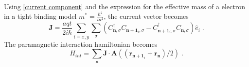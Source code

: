 \documentclass{article}
\begin{document}
Using \cref{current component} and the expression for the effective mass of a electron in a tight binding model $m^* = \frac{\hbar^2}{t a^2}$, the current vector becomes
\begin{equation}
    \textbf{J} = \frac{a q t}{2i\hbar} \sum_{i=x,y}\sum_{\sigma} \left( C_{\textbf{n},\sigma}^{\dagger} C_{\textbf{n} + \textbf{1}_i,\sigma} - C_{\textbf{n} + \textbf{1}_i,\sigma}^{\dagger} C_{\textbf{n},\sigma}\right)\hat{e}_i\;.
    \label{electric current}
\end{equation}
The paramagnetic interaction hamiltonian becomes 
\begin{equation}
    H_{int} = \sum_{\textbf{n}} \textbf{J} \cdot \textbf{A}((\textbf{r}_{\textbf{n} + \textbf{1}_i} + \textbf{r}_{\textbf{n}})/2 )\;.
    \label{interaction hamiltonian general}
\end{equation}
\end{document}
